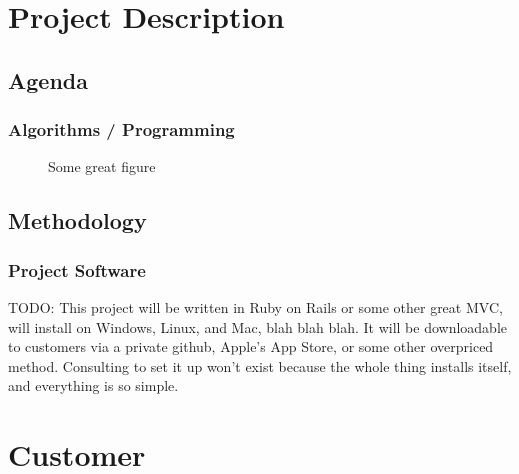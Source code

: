 
\section{Project Description}

\subsection{Agenda}

\subsubsection{Algorithms / Programming}

\begin{figure}[!h]
        \begin{center}
                \caption{Some great figure}
                \label{curves}
        \end{center}
\end{figure}


\subsection{Methodology}

\subsubsection{Project Software}
TODO: This project will be written in Ruby on Rails or some other great 
MVC, will install on Windows, Linux, and Mac, blah blah blah. It will be 
downloadable to customers via a private github, Apple's App Store,
or some other overpriced method. Consulting to set it up won't exist because
the whole thing installs itself, and everything is so simple. 

\section{Customer}

